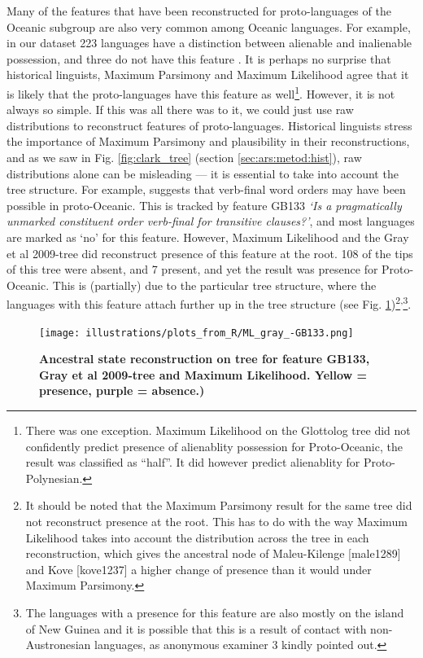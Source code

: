 \documentclass[draft,10pt]{article} %
\begin{document}
Many of the features that have been reconstructed for proto-languages of the Oceanic subgroup are also very common among Oceanic languages. For example, in our dataset 223 languages have a distinction between alienable and inalienable possession, and three do not have this feature . It is perhaps no surprise that historical linguists, Maximum Parsimony and Maximum Likelihood  agree that it is likely that the proto-languages have this feature as well\footnote{There was one exception. Maximum Likelihood on the Glottolog tree did not confidently predict presence of alienablity possession for Proto-Oceanic, the result was classified as ``half''. It did however predict alienablity for Proto-Polynesian.}. However, it is not always so simple. If this was all there was to it, we could just use raw distributions to reconstruct features of proto-languages. Historical linguists stress the importance of Maximum Parsimony and plausibility in their reconstructions, and as we saw in Fig. \ref{fig:clark_tree} (section \ref{sec:ars:metod:hist}), raw distributions alone can be misleading --- it is essential to take into account the tree structure. For example, \citet[118]{pawley1973some} suggests that verb-final word orders may have been possible in proto-Oceanic. This is tracked by feature GB133 \emph{`Is a pragmatically unmarked constituent order verb-final for transitive clauses?'}, and most languages are marked as `no' for this feature. However, Maximum Likelihood and the Gray et al 2009-tree did reconstruct presence of this feature at the root. 108 of the tips of this tree were absent, and 7 present, and yet the result was presence for Proto-Oceanic. This is (partially) due to the particular tree structure, where the languages with this feature attach further up in the tree structure (see Fig. \ref{GB133_tree_ML_gray})\footnote{It should be noted that the Maximum Parsimony result for the same tree did not reconstruct presence at the root. This has to do with the way Maximum Likelihood takes into account the distribution across the tree in each reconstruction, which gives the ancestral node of Maleu-Kilenge [male1289] and Kove [kove1237] a higher change of presence than it would under Maximum Parsimony.}\textsuperscript{,}\footnote{The languages with a presence for this feature are also mostly on the island of New Guinea and it is possible that this is a result of contact with non-Austronesian languages, as anonymous examiner 3 kindly pointed out.}.

\newpage
\begin{figure}
\centering
\texttt{[image: illustrations/plots\_from\_R/ML\_gray\_-GB133.png]}
\caption[Ancestral state reconstruction on tree for feature GB133, Gray et al 2009-tree and Maximum Likelihood.]{\textbf{Ancestral state reconstruction on tree for feature GB133, Gray et al 2009-tree and Maximum Likelihood. Yellow = presence, purple = absence.)}}
\label{GB133_tree_ML_gray}
\end{figure}
\end{document}
